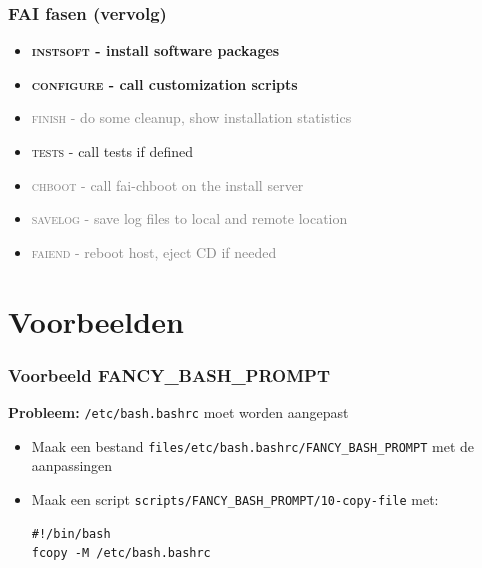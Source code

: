 \documentclass{beamer}
\newcommand{\light}[1]{\textcolor{gray}{#1}}
\begin{document}
\begin{frame}
\frametitle{FAI fasen (vervolg)}
\begin{itemize}
  \item \textbf{\textsc{instsoft}              - install software packages}
  \item<2-> \textbf{\textsc{configure}             - call customization scripts}
  \item<3-> \light{\textsc{finish}                - do some cleanup, show installation statistics}
  \item<3-> \textsc{tests}                 - call tests if defined
  \item<3-> \light{\textsc{chboot}                - call fai-chboot on the install server}
  \item<3-> \light{\textsc{savelog}               - save log files to local and remote location}
  \item<3-> \light{\textsc{faiend}                - reboot host, eject CD if needed}
\end{itemize}
\end{frame}

\section{Voorbeelden}
\begin{frame}[fragile]
\frametitle{Voorbeeld FANCY\_BASH\_PROMPT}
 
\textbf{Probleem:} \texttt{/etc/bash.bashrc} moet worden aangepast

\begin{itemize}
  \item<2-> Maak een bestand \texttt{files/etc/bash.bashrc/FANCY\_BASH\_PROMPT} met de aanpassingen
  \item<3-> Maak een script \texttt{scripts/FANCY\_BASH\_PROMPT/10-copy-file} met:
  \begin{verbatim}#!/bin/bash
fcopy -M /etc/bash.bashrc
  \end{verbatim} 
   
\end{itemize}
\end{frame}
\end{document}
